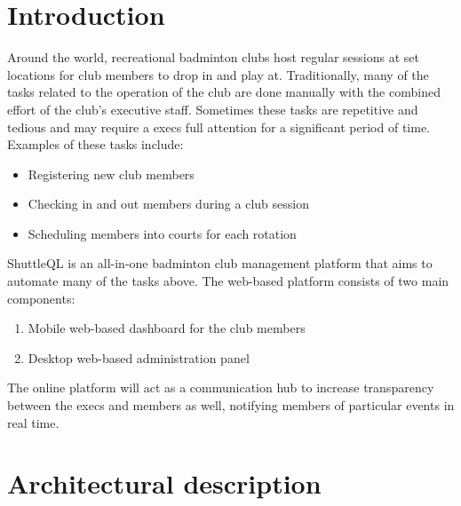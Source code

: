 \documentclass{article}
\begin{document}
\section{Introduction}
Around the world, recreational badminton clubs host regular sessions at set locations for club members to drop in and play at. Traditionally, many of the tasks related to the operation of the club are done manually with the combined effort of the club's executive staff. Sometimes these tasks are repetitive and tedious and may require a execs full attention for a significant period of time. Examples of these tasks include:
\begin{itemize}
\item Registering new club members
\item Checking in and out members during a club session
\item Scheduling members into courts for each rotation
\end{itemize}
ShuttleQL is an all-in-one badminton club management platform that aims to automate many of the tasks above. The web-based platform consists of two main components:
\begin{enumerate}
\item Mobile web-based dashboard for the club members
\item Desktop web-based administration panel
\end{enumerate}
The online platform will act as a communication hub to increase transparency between the execs and members as well, notifying members of particular events in real time.

\newpage
\section{Architectural description}
\end{document}
